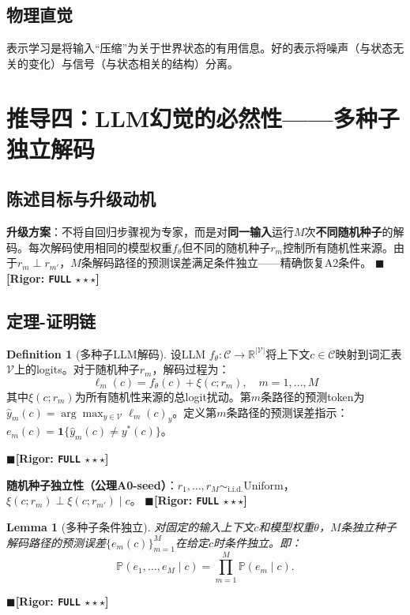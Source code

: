 \documentclass[12pt,a4paper]{ctexart}
\newtheorem{lemma}[theorem]{Lemma}
\theoremstyle{definition}
\newtheorem{definition}{Definition}[section]
\theoremstyle{remark}
\newcommand{\rigorFull}{$\blacksquare$\;\textbf{[Rigor: \texttt{FULL} $\star\star\star$]}}
\begin{document}
\subsection{物理直觉}
表示学习是将输入``压缩''为关于世界状态的有用信息。好的表示将噪声（与状态无关的变化）与信号（与状态相关的结构）分离。

\section{推导四：LLM幻觉的必然性——多种子独立解码}
\label{sec:llm}

\subsection{陈述目标与升级动机}
\textbf{升级方案}：不将自回归步骤视为专家，而是对\textbf{同一输入}运行$M$次\textbf{不同随机种子}的解码。每次解码使用相同的模型权重$f_\theta$但不同的随机种子$r_m$控制所有随机性来源。由于$r_m \perp r_{m'}$，$M$条解码路径的预测误差满足条件独立——精确恢复A2条件。
\rigorFull

\subsection{定理-证明链}

\begin{definition}[多种子LLM解码]
设LLM $f_\theta: \mathcal{C} \to \mathbb{R}^{|\mathcal{V}|}$将上下文$c \in \mathcal{C}$映射到词汇表$\mathcal{V}$上的logits。对于随机种子$r_m$，解码过程为：
\begin{equation}
\ell_m(c) = f_\theta(c) + \xi(c; r_m), \quad m = 1, \ldots, M
\end{equation}
其中$\xi(c; r_m)$为所有随机性来源的总logit扰动。第$m$条路径的预测token为$\hat{y}_m(c) = \arg\max_{y \in \mathcal{V}} \ell_m(c)_y$。定义第$m$条路径的预测误差指示：$e_m(c) = \mathbf{1}\{\hat{y}_m(c) \neq y^*(c)\}$。
\end{definition}
\rigorFull

\textbf{随机种子独立性（公理A0-seed）}：$r_1, \ldots, r_M \sim_{\text{i.i.d.}} \text{Uniform}$，$\xi(c; r_m) \perp \xi(c; r_{m'}) \mid c$。
\rigorFull

\begin{lemma}[多种子条件独立]
\label{lem:5.1}
对固定的输入上下文$c$和模型权重$\theta$，$M$条独立种子解码路径的预测误差$\{e_m(c)\}_{m=1}^M$在给定$c$时条件独立。即：
\begin{equation}
\boxed{\mathbb{P}(e_1, \ldots, e_M \mid c) = \prod_{m=1}^{M} \mathbb{P}(e_m \mid c)}.
\end{equation}
\end{lemma}
\rigorFull
\end{document}
